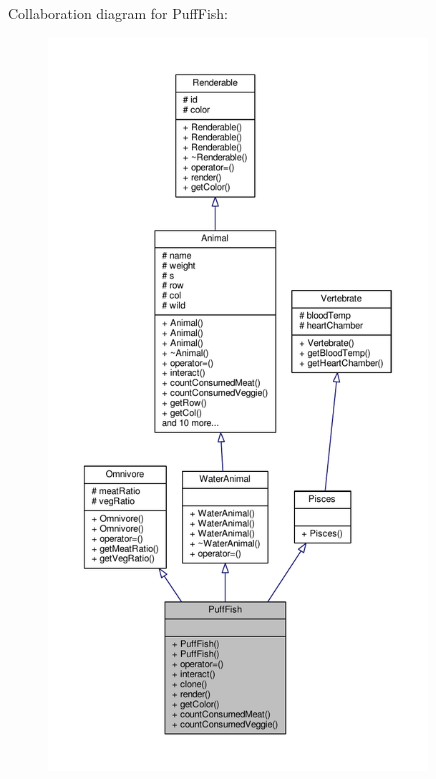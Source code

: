Collaboration diagram for Puff\+Fish\+:
\nopagebreak
\begin{figure}[H]
\begin{center}
\leavevmode
\includegraphics[height=550pt]{classPuffFish__coll__graph}
\end{center}
\end{figure}
